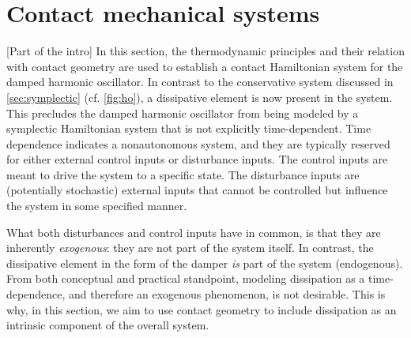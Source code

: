 \section{Contact mechanical systems}
\label{sec:contact}

[Part of the intro]
In this section, the thermodynamic principles and their relation with contact geometry are used to establish a contact Hamiltonian system for the damped harmonic oscillator. In contrast to the conservative system discussed in \cref{sec:symplectic} (cf. \cref{fig:ho}), a dissipative element is now present in the system. This precludes the damped harmonic oscillator from being modeled by a symplectic Hamiltonian system that is not explicitly time-dependent. Time dependence indicates a nonautonomous system, and they are typically reserved for either external control inputs or disturbance inputs. The control inputs are meant to drive the system to a specific state. The disturbance inputs are (potentially stochastic) external inputs that cannot be controlled but influence the system in some specified manner. 

What both disturbances and control inputs have in common, is that they are inherently \emph{exogenous}: they are not part of the system itself. In contrast, the dissipative element in the form of the damper \emph{is} part of the system (endogenous). From both conceptual and practical standpoint, modeling dissipation as a time-dependence, and therefore an exogenous phenomenon, is not desirable. This is why, in this section, we aim to use contact geometry to include dissipation as an intrinsic component of the overall system.

